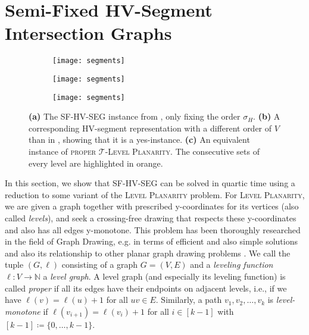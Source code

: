 \documentclass[runningheads]{llncs}
\newcommand{\tlp}{\textsc{proper $\mathcal T$-Level Planarity}\xspace}
\newcommand{\hvp}{\textsc{SF-HV-SEG}\xspace}
\begin{document}
\section{Semi-Fixed HV-Segment Intersection Graphs}\label{sec:hv}

\begin{figure}[t]
  \hspace{-.02\textwidth}
  \begin{subfigure}{.18\textwidth}
    \texttt{[image: segments]}
    \subcaption{}
    \label{fig:volkswagen2}
  \end{subfigure}\begin{subfigure}{.4\textwidth}
    \centering
    \texttt{[image: segments]}
    \subcaption{}
    \label{fig:segments-fixed}
  \end{subfigure}\begin{subfigure}{.4\textwidth}
    \texttt{[image: segments]}
    \subcaption{}
    \label{fig:tlp-inst}
  \end{subfigure}
  \caption{
    \textbf{(a)} The \hvp instance from , only fixing the order $\sigma_H$.
    \textbf{(b)} A corresponding HV-segment representation with a different order of $V$ than in , showing that it is a yes-instance.
    \textbf{(c)} An equivalent instance of \tlp. The consecutive sets of every level are highlighted in orange.
  }
  \label{fig:reduction}
\end{figure}

In this section, we show that \hvp can be solved in quartic time using a reduction to some variant of the \textsc{Level Planarity} problem.
For \textsc{Level Planarity}, we are given a graph together with prescribed y-coordinates for its vertices (also called \emph{levels}), and seek a crossing-free drawing that respects these y-coordinates and also has all edges y-monotone.
This problem has been thoroughly researched in the field of Graph Drawing, e.g. in terms of efficient and also simple solutions \cite{jlm-lpt-98,jl-lpe-02,fpss-htm-13,brs-lpt-18,brs-lpt-22} and also its relationship to other planar graph drawing problems \cite{sch-tat-13,albfr-ibpcl-15}.
We call the tuple $(G,\ell)$ consisting of a graph $G=(V,E)$ and a \emph{leveling function} $\ell : V \to \mathbb{N}$ a \emph{level graph}.
A level graph (and especially its leveling function) is called \emph{proper} if all its edges have their endpoints on adjacent levels, i.e., if we have $\ell(v) = \ell(u) + 1$ for all $uv\in E$.
Similarly, a path $v_1, v_2, \dots, v_k$ is \emph{level-monotone} if $\ell(v_{i+1}) = \ell(v_i) + 1$ for all $i \in [k-1]$ with $[k-1]\coloneq\{0,\ldots,k-1\}$.
\end{document}
